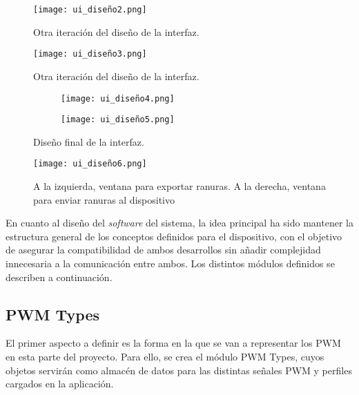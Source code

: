 \begin{figure}[h!]
    \centering
    \texttt{[image: ui\_diseño2.png]}
    \caption{Otra iteración del diseño de la interfaz.}
    \label{fig:ui_diseño2}
\end{figure}

\begin{figure}[h!]
    \centering
    \texttt{[image: ui\_diseño3.png]}
    \caption{Otra iteración del diseño de la interfaz.}
    \label{fig:ui_diseño3}
\end{figure}


\begin{figure}[h!]
    \centering
    \begin{subfigure}{0.95\textwidth}
        \texttt{[image: ui\_diseño4.png]}
    \end{subfigure}
    \vfill
    \begin{subfigure}{0.95\textwidth}
        \texttt{[image: ui\_diseño5.png]}
    \end{subfigure}
    \caption{Diseño final de la interfaz.}
\end{figure}
\label{fig:ui_diseño_final1}

\begin{figure}[h!]
    \centering
    \texttt{[image: ui\_diseño6.png]}
    \caption{A la izquierda, ventana para exportar ranuras. A la derecha, ventana para enviar ranuras al dispositivo}
    \label{fig:ui_diseño_final2}
\end{figure}

\FloatBarrier

En cuanto al diseño del \textit{software} del sistema, la idea principal ha sido mantener la estructura general de los conceptos definidos para el dispositivo, con el objetivo de asegurar la compatibilidad de ambos desarrollos sin añadir complejidad innecesaria a la comunicación entre ambos. Los distintos módulos definidos se describen a continuación.

\subsection{PWM Types}

El primer aspecto a definir es la forma en la que se van a representar los PWM en esta parte del proyecto. Para ello, se crea el módulo PWM Types, cuyos objetos servirán como almacén de datos para las distintas señales PWM y perfiles cargados en la aplicación.

